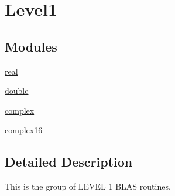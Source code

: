 \hypertarget{group__level1}{}\section{Level1}
\label{group__level1}
\subsection*{Modules}
\begin{DoxyCompactItemize}
\item 
\hyperlink{group__single__blas__level1}{real}
\item 
\hyperlink{group__double__blas__level1}{double}
\item 
\hyperlink{group__complex__blas__level1}{complex}
\item 
\hyperlink{group__complex16__blas__level1}{complex16}
\end{DoxyCompactItemize}


\subsection{Detailed Description}
This is the group of L\+E\+V\+E\+L 1 B\+L\+A\+S routines. 